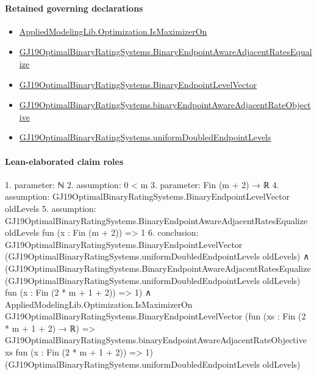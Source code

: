 \documentclass[10pt]{article}
\begin{document}
\paragraph{Retained governing declarations}
\begin{itemize}\raggedright
\item \hyperlink{governing-declaration-67616b2feb727132}{Applied\allowbreak{}Modeling\allowbreak{}Lib.\allowbreak{}Optimization.\allowbreak{}Is\allowbreak{}Maximizer\allowbreak{}On}
\item \hyperlink{governing-declaration-5a62c276eedad684}{GJ19\allowbreak{}Optimal\allowbreak{}Binary\allowbreak{}Rating\allowbreak{}Systems.\allowbreak{}Binary\allowbreak{}Endpoint\allowbreak{}Aware\allowbreak{}Adjacent\allowbreak{}Rates\allowbreak{}Equalize}
\item \hyperlink{governing-declaration-aa797f827cdcda67}{GJ19\allowbreak{}Optimal\allowbreak{}Binary\allowbreak{}Rating\allowbreak{}Systems.\allowbreak{}Binary\allowbreak{}Endpoint\allowbreak{}Level\allowbreak{}Vector}
\item \hyperlink{governing-declaration-90a6fa979204b5b7}{GJ19\allowbreak{}Optimal\allowbreak{}Binary\allowbreak{}Rating\allowbreak{}Systems.\allowbreak{}binary\allowbreak{}Endpoint\allowbreak{}Aware\allowbreak{}Adjacent\allowbreak{}Rate\allowbreak{}Objective}
\item \hyperlink{governing-declaration-a6f787e3a999e2da}{GJ19\allowbreak{}Optimal\allowbreak{}Binary\allowbreak{}Rating\allowbreak{}Systems.\allowbreak{}uniform\allowbreak{}Doubled\allowbreak{}Endpoint\allowbreak{}Levels}
\end{itemize}
\paragraph{Lean-elaborated claim roles}\begin{ReviewVerbatim}
1. parameter: ℕ
2. assumption: 0 < m
3. parameter: Fin (m + 2) → ℝ
4. assumption: GJ19OptimalBinaryRatingSystems.BinaryEndpointLevelVector oldLevels
5. assumption: GJ19OptimalBinaryRatingSystems.BinaryEndpointAwareAdjacentRatesEqualize oldLevels fun (x : Fin (m + 2)) => 1
6. conclusion: GJ19OptimalBinaryRatingSystems.BinaryEndpointLevelVector
    (GJ19OptimalBinaryRatingSystems.uniformDoubledEndpointLevels oldLevels) ∧
  (GJ19OptimalBinaryRatingSystems.BinaryEndpointAwareAdjacentRatesEqualize
      (GJ19OptimalBinaryRatingSystems.uniformDoubledEndpointLevels oldLevels) fun (x : Fin (2 * m + 1 + 2)) => 1) ∧
    AppliedModelingLib.Optimization.IsMaximizerOn GJ19OptimalBinaryRatingSystems.BinaryEndpointLevelVector
      (fun (xs : Fin (2 * m + 1 + 2) → ℝ) =>
        GJ19OptimalBinaryRatingSystems.binaryEndpointAwareAdjacentRateObjective xs fun (x : Fin (2 * m + 1 + 2)) => 1)
      (GJ19OptimalBinaryRatingSystems.uniformDoubledEndpointLevels oldLevels)
\end{ReviewVerbatim}
\end{document}
